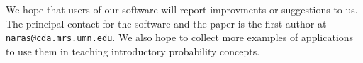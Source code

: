 We hope that users of our software will report improvments or
suggestions to us.  The principal contact for the software and the
paper is the first author at {\tt naras@cda.mrs.umn.edu}.  
We also hope to collect more examples of applications to use them in
teaching introductory probability concepts.  